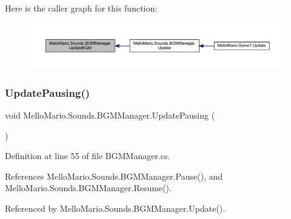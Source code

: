 Here is the caller graph for this function\+:
\nopagebreak
\begin{figure}[H]
\begin{center}
\leavevmode
\includegraphics[width=350pt]{classMelloMario_1_1Sounds_1_1BGMManager_ac40d481758a6e2812b3db145c68f46df_icgraph}
\end{center}
\end{figure}
\mbox{\label{classMelloMario_1_1Sounds_1_1BGMManager_aa88afc7fae97d54e5fabfbdeb3b7d894}} 
\subsubsection{Update\+Pausing()}
{\footnotesize\ttfamily void Mello\+Mario.\+Sounds.\+B\+G\+M\+Manager.\+Update\+Pausing (\begin{DoxyParamCaption}{ }\end{DoxyParamCaption})\hspace{0.3cm}{\ttfamily [private]}}



Definition at line 55 of file B\+G\+M\+Manager.\+cs.



References Mello\+Mario.\+Sounds.\+B\+G\+M\+Manager.\+Pause(), and Mello\+Mario.\+Sounds.\+B\+G\+M\+Manager.\+Resume().



Referenced by Mello\+Mario.\+Sounds.\+B\+G\+M\+Manager.\+Update().


